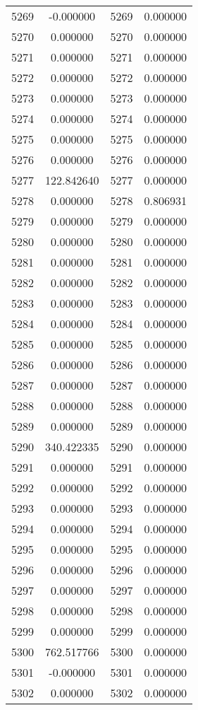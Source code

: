 \documentclass[12pt]{article}
\begin{document}
\begin{longtable}{@{}cccc@{}}
5269 & -0.000000 & 5269 & 0.000000 \\
5270 & 0.000000 & 5270 & 0.000000 \\
5271 & 0.000000 & 5271 & 0.000000 \\
5272 & 0.000000 & 5272 & 0.000000 \\
5273 & 0.000000 & 5273 & 0.000000 \\
5274 & 0.000000 & 5274 & 0.000000 \\
5275 & 0.000000 & 5275 & 0.000000 \\
5276 & 0.000000 & 5276 & 0.000000 \\
5277 & 122.842640 & 5277 & 0.000000 \\
5278 & 0.000000 & 5278 & 0.806931 \\
5279 & 0.000000 & 5279 & 0.000000 \\
5280 & 0.000000 & 5280 & 0.000000 \\
5281 & 0.000000 & 5281 & 0.000000 \\
5282 & 0.000000 & 5282 & 0.000000 \\
5283 & 0.000000 & 5283 & 0.000000 \\
5284 & 0.000000 & 5284 & 0.000000 \\
5285 & 0.000000 & 5285 & 0.000000 \\
5286 & 0.000000 & 5286 & 0.000000 \\
5287 & 0.000000 & 5287 & 0.000000 \\
5288 & 0.000000 & 5288 & 0.000000 \\
5289 & 0.000000 & 5289 & 0.000000 \\
5290 & 340.422335 & 5290 & 0.000000 \\
5291 & 0.000000 & 5291 & 0.000000 \\
5292 & 0.000000 & 5292 & 0.000000 \\
5293 & 0.000000 & 5293 & 0.000000 \\
5294 & 0.000000 & 5294 & 0.000000 \\
5295 & 0.000000 & 5295 & 0.000000 \\
5296 & 0.000000 & 5296 & 0.000000 \\
5297 & 0.000000 & 5297 & 0.000000 \\
5298 & 0.000000 & 5298 & 0.000000 \\
5299 & 0.000000 & 5299 & 0.000000 \\
5300 & 762.517766 & 5300 & 0.000000 \\
5301 & -0.000000 & 5301 & 0.000000 \\
5302 & 0.000000 & 5302 & 0.000000 \\

\end{longtable}
\end{document}
